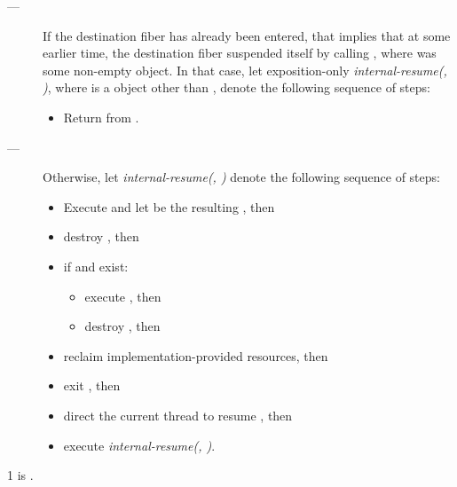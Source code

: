 \begin{description}
    \item[---]
          If the destination fiber has already been entered, that implies that
          at some earlier time, the destination fiber suspended itself by
          calling \resumewith[other], where  was some
          non-empty \fiber object. In that case, let
          exposition-only \emph{internal-resume(, )},
          where  is a \fiber object other than , denote
          the following sequence of steps:
        \begin{itemize}
            \item Return  from \resumewith[other].
        \end{itemize}   
    \item[---] Otherwise, let \emph{internal-resume(, )}
          denote the following sequence of steps:
        \begin{itemize}
            \item Execute
                  and let  be the resulting \fiber, then
            \item destroy , then
            \item if  and  exist:
                \begin{itemize}
                    \item execute , then
                    \item destroy , then
                \end{itemize}
            \item reclaim implementation-provided resources, then
            \item exit , then
            \item direct the current thread to resume , then
            \item execute \emph{internal-resume(, )}.
        \end{itemize}
\end{description}

1 \mandates
{} is \true.

